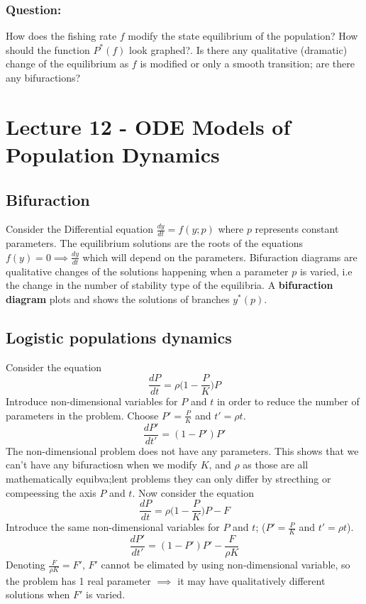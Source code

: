 \documentclass[a6paper]{article}
\theoremstyle{definition}
\theoremstyle{plain}
\theoremstyle{remark}
\begin{document}
\subsubsection*{Question:}
How does the fishing rate $ f $ modify the state equilibrium of the population?
How should the function $ P^* (f) $ look graphed?. Is there any qualitative
(dramatic) change of the equilibrium as $ f $ is modified or only a smooth
transition; are there any bifuractions?
\section{Lecture 12 - ODE Models of Population Dynamics}
\subsection{Bifuraction}
Consider the Differential equation $ \displaystyle \frac{dy}{dt} = f(y;p)
$ where $ p $ represents constant parameters. The equilibrium solutions are the
roots of the equations $ f(y) = 0 \implies \displaystyle \frac{dy}{dt} $ which
will depend on the parameters. Bifuraction diagrams are qualitative changes of
the solutions happening when a parameter $ p $ is varied, i.e the change in the
number of stability type of the equilibria. A \textbf{bifuraction diagram}
plots and shows the solutions of branches $ y^*(p) $. 
\subsection{Logistic populations dynamics}
Consider the equation 
$$ \frac{dP}{dt} = \rho \Big (1 - \frac{P}{K} \Big ) P $$
Introduce non-dimensional variables for $ P $ and $ t $ in order to reduce the
number of parameters in the problem. Choose $ P' = \frac{P}{K}  $ and $ t'
= \rho t $. 
$$ \frac{dP'}{dt'} = (1-P')P' $$
The non-dimensional problem does not have any parameters. This shows that we
can't have any bifuractiosn when we modify $ K $, and $ \rho $ as those are all
mathematically equibva;lent problems they can only differ by strecthing or
compeessing the axis $ P $ and $ t $. Now consider the equation 
$$ \frac{dP}{dt} = \rho \Big (1 - \frac{P}{K} \Big) P - F $$
Introduce the same non-dimensional variables for $ P $ and $ t $;
($ P' = \frac{P}{K} $ and $ t' = \rho t $).
$$ \frac{dP'}{dt'} = (1-P')P' - \frac{F}{\rho K} $$
Denoting $ \displaystyle \frac{F}{\rho K} = F' $, $ F' $ cannot be elimated by
using non-dimensional variable, so the problem has 1 real parameter $ \implies
$ it may have qualitatively different solutions when $ F' $ is varied.
\end{document}
